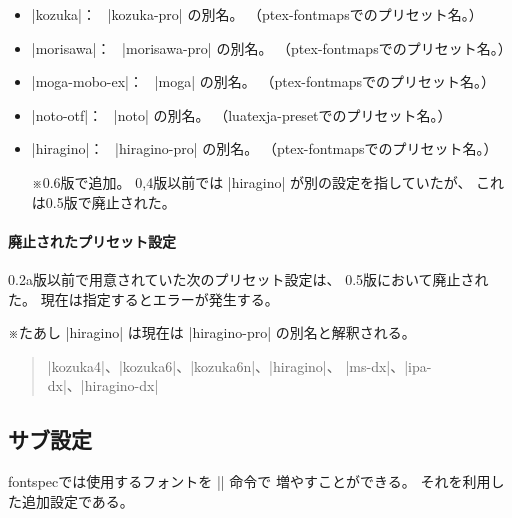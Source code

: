 \documentclass[xelatex,ja=standard,jafont=ipaex,
  a4paper]{bxjsarticle}
\newcommand{\Pkg}[1]{\textsf{#1}}
\newcommand{\Note}{\par\noindent ※}
\newcommand{\Means}{：\ }
\begin{document}
\begin{itemize}
\item |kozuka|\Means
  |kozuka-pro| の別名。
  （\Pkg{ptex-fontmaps}でのプリセット名。）
\item |morisawa|\Means
  |morisawa-pro| の別名。
  （\Pkg{ptex-fontmaps}でのプリセット名。）
\item |moga-mobo-ex|\Means
  |moga| の別名。
  （\Pkg{ptex-fontmaps}でのプリセット名。）
\item |noto-otf|\Means
  |noto| の別名。
  （\Pkg{luatexja-preset}でのプリセット名。）
\item |hiragino|\Means
  |hiragino-pro| の別名。
  （\Pkg{ptex-fontmaps}でのプリセット名。）
  \Note 0.6版で追加。
  0,4版以前では |hiragino| が別の設定を指していたが、
  これは0.5版で廃止された。
\end{itemize}

\paragraph{廃止されたプリセット設定}

0.2a版以前で用意されていた次のプリセット設定は、
0.5版において廃止された。
現在は指定するとエラーが発生する。

\Note たあし |hiragino| は現在は |hiragino-pro| の別名と解釈される。

\begin{quote}
|kozuka4|、|kozuka6|、|kozuka6n|、|hiragino|、
|ms-dx|、|ipa-dx|、|hiragino-dx|
\end{quote}

\subsection{サブ設定}

\Pkg{fontspec}では使用するフォントを |\newfontfamily| 命令で
増やすことができる。
それを利用した追加設定である。
\end{document}
